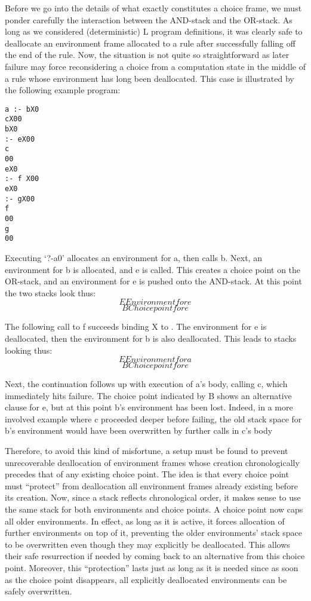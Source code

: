 
Before we go into the details of what exactly constitutes a choice frame, we must
ponder carefully the interaction between the AND-stack and the OR-stack. As
long as we considered (deterministic) L program definitions, it was clearly safe
to deallocate an environment frame allocated to a rule after successfully falling
off the end of the rule. Now, the situation is not quite so straightforward as later
failure may force reconsidering a choice from a computation state in the middle
of a rule whose environment has long been deallocated. This case is illustrated by
the following example program:
\begin{verbatim}
a :- bX0
cX00
bX0
:- eX00
c
00
eX0
:- f X00
eX0
:- gX00
f
00
g
00
\end{verbatim}

Executing ‘?-a0’ allocates an environment for a, then calls b. Next, an environment
for b is allocated, and e is called. This creates a choice point on the
OR-stack, and an environment for e is pushed onto the AND-stack. At this point
the two stacks look thus:
\[E  Environment for e\]
\[B  Choice point for e\]

The following call to f succeeds binding X to 	. The environment for e is deallocated,
then the environment for b is also deallocated. This leads to stacks looking
thus:
\[E  Environment for a\]
\[B  Choice point for e\]

Next, the continuation follows up with execution of a’s body, calling c, which
immediately hits failure. The choice point indicated by B shows an alternative
clause for e, but at this point b’s environment has been lost. Indeed, in a more
involved example where c proceeded deeper before failing, the old stack space for
b’s environment would have been overwritten by further calls in c’s body

Therefore, to avoid this kind of misfortune, a setup must be found to prevent
unrecoverable deallocation of environment frames whose creation chronologically
precedes that of any existing choice point. The idea is that every choice point
must “protect” from deallocation all environment frames already existing before
its creation. Now, since a stack reflects chronological order, it makes sense to
use the same stack for both environments and choice points. A choice point now
caps all older environments. In effect, as long as it is active, it forces allocation of
further environments on top of it, preventing the older environments’ stack space
to be overwritten even though they may explicitly be deallocated. This allows
their safe resurrection if needed by coming back to an alternative from this choice
point. Moreover, this “protection” lasts just as long as it is needed since as soon as
the choice point disappears, all explicitly deallocated environments can be safely
overwritten.

